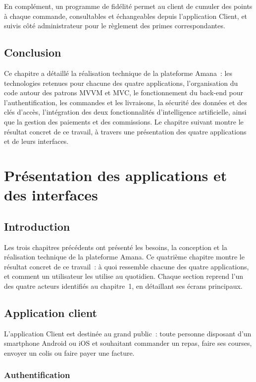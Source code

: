 \documentclass[12pt,fleqn,a4paper]{report}
\begin{document}
\begin{justify}
En complément, un programme de fidélité permet au client de cumuler des points à chaque commande, consultables et échangeables depuis l'application Client, et suivis côté administrateur pour le règlement des primes correspondantes.

\section{Conclusion}

Ce chapitre a détaillé la réalisation technique de la plateforme Amana~: les technologies retenues pour chacune des quatre applications, l'organisation du code autour des patrons MVVM et MVC, le fonctionnement du back-end pour l'authentification, les commandes et les livraisons, la sécurité des données et des clés d'accès, l'intégration des deux fonctionnalités d'intelligence artificielle, ainsi que la gestion des paiements et des commissions. Le chapitre suivant montre le résultat concret de ce travail, à travers une présentation des quatre applications et de leurs interfaces.

\chapter{Présentation des applications et des interfaces}

\section{Introduction}

Les trois chapitres précédents ont présenté les besoins, la conception et la réalisation technique de la plateforme Amana. Ce quatrième chapitre montre le résultat concret de ce travail~: à quoi ressemble chacune des quatre applications, et comment un utilisateur les utilise au quotidien. Chaque section reprend l'un des quatre acteurs identifiés au chapitre~1, en détaillant ses écrans principaux.

\section{Application client}

L'application Client est destinée au grand public~: toute personne disposant d'un smartphone Android ou iOS et souhaitant commander un repas, faire ses courses, envoyer un colis ou faire payer une facture.

\subsection{Authentification}


\end{justify}
\end{document}

